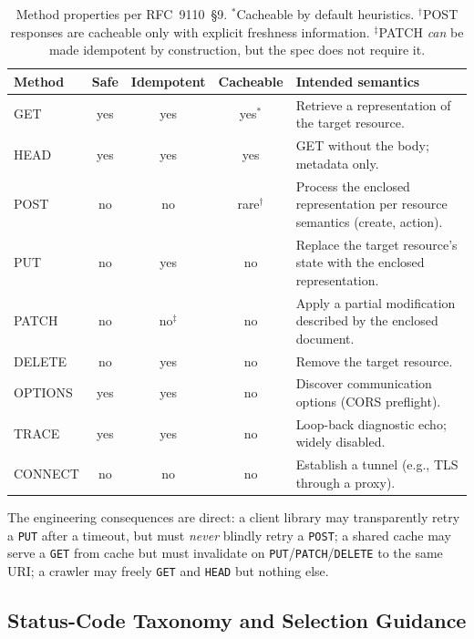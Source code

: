 \begin{table}[h]
  \centering
  \small
  \begin{tabularx}{\textwidth}{l c c c X}
    \toprule
    \textbf{Method} & \textbf{Safe} & \textbf{Idempotent} & \textbf{Cacheable} & \textbf{Intended semantics} \\
    \midrule
    GET     & yes & yes & yes$^{*}$ & Retrieve a representation of the target resource. \\
    HEAD    & yes & yes & yes       & GET without the body; metadata only. \\
    POST    & no  & no  & rare$^{\dagger}$ & Process the enclosed representation per resource semantics (create, action). \\
    PUT     & no  & yes & no        & Replace the target resource's state with the enclosed representation. \\
    PATCH   & no  & no$^{\ddagger}$ & no & Apply a partial modification described by the enclosed document. \\
    DELETE  & no  & yes & no        & Remove the target resource. \\
    OPTIONS & yes & yes & no        & Discover communication options (CORS preflight). \\
    TRACE   & yes & yes & no        & Loop-back diagnostic echo; widely disabled. \\
    CONNECT & no  & no  & no        & Establish a tunnel (e.g., TLS through a proxy). \\
    \bottomrule
  \end{tabularx}
  \caption{Method properties per RFC~9110~\S9. $^{*}$Cacheable by default heuristics. $^{\dagger}$POST responses are cacheable only with explicit freshness information. $^{\ddagger}$PATCH \emph{can} be made idempotent by construction, but the spec does not require it.}
  \label{tab:methods}
\end{table}

The engineering consequences are direct: a client library may transparently retry a \texttt{PUT} after a timeout, but must \emph{never} blindly retry a \texttt{POST}; a shared cache may serve a \texttt{GET} from cache but must invalidate on \texttt{PUT}/\texttt{PATCH}/\texttt{DELETE} to the same URI; a crawler may freely \texttt{GET} and \texttt{HEAD} but nothing else.

\subsection{Status-Code Taxonomy and Selection Guidance}

